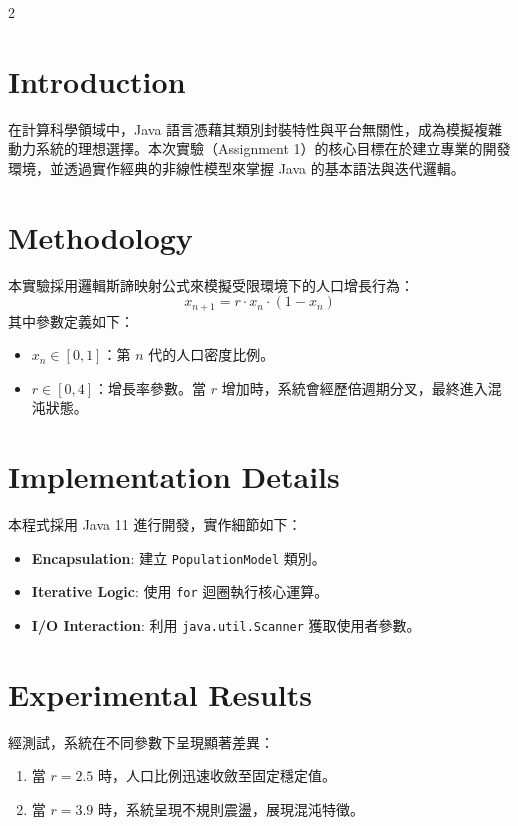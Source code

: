 \documentclass[11pt, a4paper]{article}
\begin{document}
\begin{multicols}{2}

\section{Introduction}
在計算科學領域中，Java 語言憑藉其類別封裝特性與平台無關性，成為模擬複雜動力系統的理想選擇。本次實驗（Assignment 1）的核心目標在於建立專業的開發環境，並透過實作經典的非線性模型來掌握 Java 的基本語法與迭代邏輯。


\section{Methodology}
本實驗採用邏輯斯諦映射公式來模擬受限環境下的人口增長行為：
\begin{equation}
x_{n+1} = r \cdot x_n \cdot (1 - x_n)
\end{equation}
其中參數定義如下：
\begin{itemize}
    \item $x_n \in [0, 1]$：第 $n$ 代的人口密度比例。
    \item $r \in [0, 4]$：增長率參數。當 $r$ 增加時，系統會經歷倍週期分叉，最終進入混沌狀態。
\end{itemize}


\section{Implementation Details}
本程式採用 Java 11 進行開發，實作細節如下：
\begin{itemize}
    \item \textbf{Encapsulation}: 建立 \texttt{PopulationModel} 類別。
    \item \textbf{Iterative Logic}: 使用 \texttt{for} 迴圈執行核心運算。
    \item \textbf{I/O Interaction}: 利用 \texttt{java.util.Scanner} 獲取使用者參數。
\end{itemize}


\section{Experimental Results}
經測試，系統在不同參數下呈現顯著差異：
\begin{enumerate}
    \item 當 $r=2.5$ 時，人口比例迅速收斂至固定穩定值。
    \item 當 $r=3.9$ 時，系統呈現不規則震盪，展現混沌特徵。
\end{enumerate}



\end{multicols}
\end{document}
